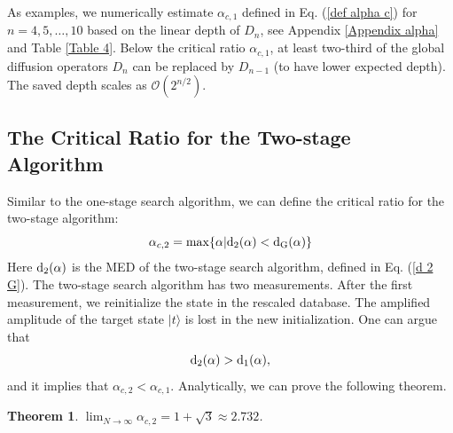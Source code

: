 \documentclass[%
 twocolumn,
 10pt,
 superscriptaddress,
 longbibliography,
 amsmath,amssymb,
 aps,
 pra,
floatfix,
]{revtex4-1}
\newcommand{\eq}{\begin{equation}}
\newcommand{\en}{\end{equation}}
\newtheorem{theo}{Theorem}
\begin{document}
As examples, we numerically estimate $\alpha_{c,1}$ defined in Eq. (\ref{def alpha c}) for $n=4,5,\ldots,10$ based on the linear depth of $D_n$, see Appendix \ref{Appendix alpha} and Table \ref{Table 4}. Below the critical ratio $\alpha_{c,1}$, at least two-third of the global diffusion operators $D_n$ can be replaced by $D_{n-1}$ (to have lower expected depth). The saved depth scales as $\mathcal O(2^{n/2})$.


\subsection{\label{sec: two stage alpha}The Critical Ratio for the Two-stage Algorithm}

Similar to the one-stage search algorithm, we can define the critical ratio for the two-stage algorithm:
\eq
\label{def alpha c 2}
\alpha_{c,2}=\max\{\alpha|{\text d}_2(\alpha) <{\text d}_{\text G}(\alpha)\}
\en
Here $\text d_2(\alpha)$ is the MED of the two-stage search algorithm, defined in Eq. (\ref{d 2 G}). The two-stage search algorithm has two measurements. After the first measurement, we reinitialize the state in the rescaled database. The amplified amplitude of the target state $|t\rangle$ is lost in the new initialization. One can argue that
\begin{equation}
	{\rm d}_2(\alpha)>{\rm d}_{1}(\alpha),
\end{equation}
and it implies that  $\alpha_{c,2}<\alpha_{c,1}$.  Analytically, we can prove the following theorem.
\begin{theo} \label{theorem 2}
	$\lim_{N\rightarrow\infty}\alpha_{c,2} = 1+\sqrt 3 \approx 2.732$.
\end{theo}
\end{document}
